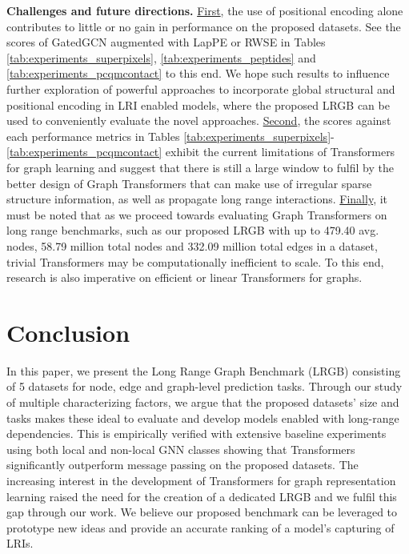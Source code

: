 \documentclass{article}
\begin{document}
\textbf{Challenges and future directions.}
\underline{First}, the use of positional encoding alone contributes to little or no gain in performance on the proposed datasets. See the scores of GatedGCN augmented with LapPE or RWSE in Tables \ref{tab:experiments_superpixels}, \ref{tab:experiments_peptides} and \ref{tab:experiments_pcqmcontact} to this end. We hope such results to influence further exploration of powerful approaches to incorporate global structural and positional encoding in LRI enabled models, where the proposed LRGB can be used to conveniently evaluate the novel approaches. 
\underline{Second}, the scores against each performance metrics in Tables \ref{tab:experiments_superpixels}-\ref{tab:experiments_pcqmcontact} exhibit the current limitations of Transformers for graph learning and suggest that there is still a large window to fulfil by the better design of Graph Transformers that can make use of irregular sparse structure information, as well as propagate long range interactions. 
\underline{Finally}, it must be noted that as we proceed towards evaluating Graph Transformers on long range benchmarks, such as our proposed LRGB with up to 479.40 avg. nodes, 58.79 million total nodes and 332.09 million total edges in a dataset, trivial  Transformers may be computationally inefficient to scale. To this end, research is also imperative on efficient or linear Transformers for graphs.






\section{Conclusion}
In this paper, we present the Long Range Graph Benchmark (LRGB) consisting of 5 datasets for node, edge and graph-level prediction tasks. Through our study of multiple characterizing factors, we argue that the proposed datasets' size and tasks makes these ideal to evaluate and develop models enabled with long-range dependencies. This is empirically verified with extensive baseline experiments using both local and non-local GNN classes showing that Transformers significantly outperform message passing on the proposed datasets.
The increasing interest in the development of Transformers for graph representation learning raised the need for the creation of a dedicated LRGB and we fulfil this gap through our work. We believe our proposed benchmark can be leveraged to prototype new ideas and provide an accurate ranking of a model's capturing of LRIs.
\end{document}

